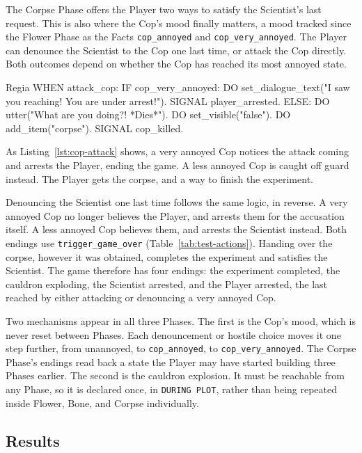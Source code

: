 The Corpse Phase offers the Player two ways to satisfy the Scientist's last request. This is also where the Cop's mood finally matters, a mood tracked since the Flower Phase as the Facts \lstinline|cop_annoyed| and \lstinline|cop_very_annoyed|. The Player can denounce the Scientist to the Cop one last time, or attack the Cop directly. Both outcomes depend on whether the Cop has reached its most annoyed state.

\begin{codeblock}[]{Regia}
WHEN attack_cop:
    IF cop_very_annoyed:
        DO set_dialogue_text("I saw you reaching! You are under arrest!").
        SIGNAL player_arrested.
    ELSE:
        DO utter("What are you doing?! *Dies*").
        DO set_visible("false").
        DO add_item("corpse").
        SIGNAL cop_killed.
\end{codeblock}

As Listing~\ref{lst:cop-attack} shows, a very annoyed Cop notices the attack coming and arrests the Player, ending the game. A less annoyed Cop is caught off guard instead. The Player gets the corpse, and a way to finish the experiment.

Denouncing the Scientist one last time follows the same logic, in reverse. A very annoyed Cop no longer believes the Player, and arrests them for the accusation itself. A less annoyed Cop believes them, and arrests the Scientist instead. Both endings use \lstinline|trigger_game_over| (Table~\ref{tab:test-actions}). Handing over the corpse, however it was obtained, completes the experiment and satisfies the Scientist. The game therefore has four endings: the experiment completed, the cauldron exploding, the Scientist arrested, and the Player arrested, the last reached by either attacking or denouncing a very annoyed Cop.

\bigskip

Two mechanisms appear in all three Phases. The first is the Cop's mood, which is never reset between Phases. Each denouncement or hostile choice moves it one step further, from unannoyed, to \lstinline|cop_annoyed|, to \lstinline|cop_very_annoyed|. The Corpse Phase's endings read back a state the Player may have started building three Phases earlier. The second is the cauldron explosion. It must be reachable from any Phase, so it is declared once, in \lstinline|DURING PLOT|, rather than being repeated inside Flower, Bone, and Corpse individually.

\subsection{Results}
\label{sec:test-results}


